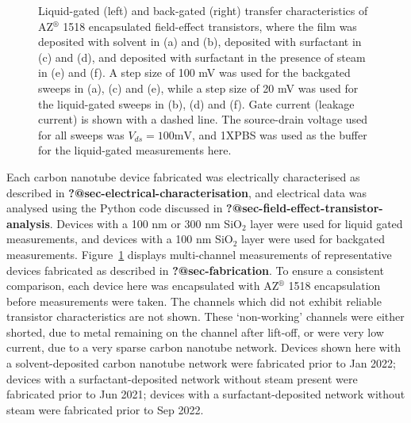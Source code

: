 \documentclass[
  a4paper,
]{scrbook}
\begin{document}
\begin{figure}
\begin{minipage}[t]{0.49\linewidth}
{{}

}

\subcaption{\label{fig-steam-tx-bg}}
\end{minipage}%

\caption{\label{fig-pristine-cnt-characteristics}Liquid-gated (left) and
back-gated (right) transfer characteristics of AZ\(^\circledR\) 1518
encapsulated field-effect transistors, where the film was deposited with
solvent in (a) and (b), deposited with surfactant in (c) and (d), and
deposited with surfactant in the presence of steam in (e) and (f). A
step size of 100 mV was used for the backgated sweeps in (a), (c) and
(e), while a step size of 20 mV was used for the liquid-gated sweeps in
(b), (d) and (f). Gate current (leakage current) is shown with a dashed
line. The source-drain voltage used for all sweeps was
\(V_{ds} = 100 \textrm{mV}\), and 1XPBS was used as the buffer for the
liquid-gated measurements here.}

\end{figure}

Each carbon nanotube device fabricated was electrically characterised as
described in \textbf{?@sec-electrical-characterisation}, and electrical
data was analysed using the Python code discussed in
\textbf{?@sec-field-effect-transistor-analysis}. Devices with a 100 nm
or 300 nm SiO\(_2\) layer were used for liquid gated measurements, and
devices with a 100 nm SiO\(_2\) layer were used for backgated
measurements. Figure~\ref{fig-pristine-cnt-characteristics} displays
multi-channel measurements of representative devices fabricated as
described in \textbf{?@sec-fabrication}. To ensure a consistent
comparison, each device here was encapsulated with AZ\(^\circledR\) 1518
encapsulation before measurements were taken. The channels which did not
exhibit reliable transistor characteristics are not shown. These
`non-working' channels were either shorted, due to metal remaining on
the channel after lift-off, or were very low current, due to a very
sparse carbon nanotube network. Devices shown here with a
solvent-deposited carbon nanotube network were fabricated prior to Jan
2022; devices with a surfactant-deposited network without steam present
were fabricated prior to Jun 2021; devices with a surfactant-deposited
network without steam were fabricated prior to Sep 2022.
\end{document}
